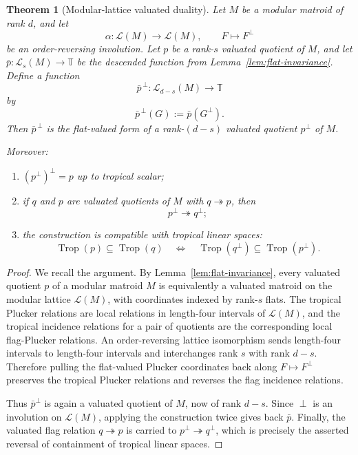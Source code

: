 \documentclass[11pt]{article}
\newcommand{\Trop}{\operatorname{Trop}}
\newcommand{\cL}{\mathcal L}
\theoremstyle{plain}
\newtheorem{theorem}{Theorem}[section]
\theoremstyle{definition}
\begin{document}
\begin{theorem}[Modular-lattice valuated duality]\label{thm:modular-duality}
Let \(M\) be a modular matroid of rank \(d\), and let
\[
   \alpha:\cL(M)\longrightarrow \cL(M),\qquad F\longmapsto F^\perp
\]
be an order-reversing involution.  Let \(p\) be a rank-\(s\) valuated quotient of \(M\), and let \(\bar p:\cL_s(M)\to \mathbb T\) be the descended function from Lemma~\ref{lem:flat-invariance}.  Define a function
\[
   \bar p^{\,\perp}:\cL_{d-s}(M)\longrightarrow \mathbb T
\]
by
\[
   \bar p^{\,\perp}(G):=\bar p(G^\perp).
\]
Then \(\bar p^{\,\perp}\) is the flat-valued form of a rank-\((d-s)\) valuated quotient \(p^\perp\) of \(M\).

Moreover:
\begin{enumerate}[label=\textup{(\roman*)}]
\item \((p^\perp)^\perp=p\) up to tropical scalar;
\item if \(q\) and \(p\) are valuated quotients of \(M\) with \(q\twoheadrightarrow p\), then
\[
   p^\perp\twoheadrightarrow q^\perp;
\]
\item the construction is compatible with tropical linear spaces:
\[
   \Trop(p)\subseteq \Trop(q)
   \quad\Longleftrightarrow\quad
   \Trop(q^\perp)\subseteq \Trop(p^\perp).
\]
\end{enumerate}
\end{theorem}

\begin{proof}
We recall the argument.  By Lemma~\ref{lem:flat-invariance}, every valuated quotient \(p\) of a modular matroid \(M\) is equivalently a valuated matroid on the modular lattice \(\cL(M)\), with coordinates indexed by rank-\(s\) flats.  The tropical Plucker relations are local relations in length-four intervals of \(\cL(M)\), and the tropical incidence relations for a pair of quotients are the corresponding local flag-Plucker relations.  An order-reversing lattice isomorphism sends length-four intervals to length-four intervals and interchanges rank \(s\) with rank \(d-s\).  Therefore pulling the flat-valued Plucker coordinates back along \(F\mapsto F^\perp\) preserves the tropical Plucker relations and reverses the flag incidence relations.

Thus \(\bar p^\perp\) is again a valuated quotient of \(M\), now of rank \(d-s\).  Since \(\perp\) is an involution on \(\cL(M)\), applying the construction twice gives back \(\bar p\).  Finally, the valuated flag relation \(q\twoheadrightarrow p\) is carried to \(p^\perp\twoheadrightarrow q^\perp\), which is precisely the asserted reversal of containment of tropical linear spaces.
\end{proof}
\end{document}
